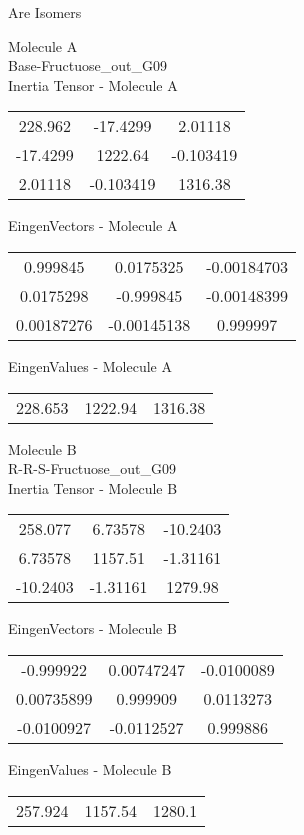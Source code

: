 \begin{center}
\vtab
\vtab
\textcolor{NavyBlue}{\Large Are Isomers}
\end{center}
\newpage
\begin{multicols}{2}
\begin{center}
Molecule A \\ 
Base-Fructuose\_out\_G09
\\
Inertia Tensor - Molecule A \\
\vtab
\begin{tabular}{|c c c|}
228.962	 & 	-17.4299	 & 	2.01118	 \\
-17.4299	 & 	1222.64	 & 	-0.103419	 \\
2.01118	 & 	-0.103419	 & 	1316.38
\end{tabular}

\vtab
 EingenVectors - Molecule A     \\
\vtab
\begin{tabular}{|c c c|}
0.999845	 & 	0.0175325	 & 	-0.00184703	 \\
0.0175298	 & 	-0.999845	 & 	-0.00148399	 \\
0.00187276	 & 	-0.00145138	 & 	0.999997
\end{tabular}

\vtab
 EingenValues - Molecule A     \\
\vtab
\begin{tabular}{|c c c|}
228.653	 & 	1222.94	 & 	1316.38
\end{tabular}
\columnbreak

Molecule B \\ 
R-R-S-Fructuose\_out\_G09
\\
Inertia Tensor - Molecule B \\
\vtab
\begin{tabular}{|c c c|}
258.077	 & 	6.73578	 & 	-10.2403	 \\
6.73578	 & 	1157.51	 & 	-1.31161	 \\
-10.2403	 & 	-1.31161	 & 	1279.98
\end{tabular}

\vtab
 EingenVectors - Molecule B     \\
\vtab
\begin{tabular}{|c c c|}
-0.999922	 & 	0.00747247	 & 	-0.0100089	 \\
0.00735899	 & 	0.999909	 & 	0.0113273	 \\
-0.0100927	 & 	-0.0112527	 & 	0.999886
\end{tabular}

\vtab
 EingenValues - Molecule B     \\
\vtab
\begin{tabular}{|c c c|}
257.924	 & 	1157.54	 & 	1280.1
\end{tabular}

\end{center}
\end{multicols}
